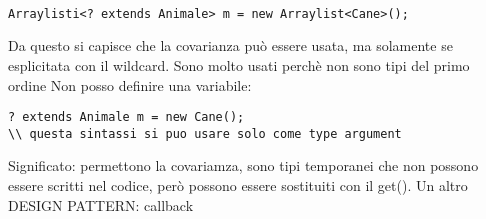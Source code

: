 \begin{lstlisting}[basicstyle=\small,]

Arraylisti<? extends Animale> m = new Arraylist<Cane>();

\end{lstlisting}

Da questo si capisce che la covarianza può essere usata, ma solamente se esplicitata con il wildcard. \newline
Sono molto usati perchè non sono tipi del primo ordine \newline
Non posso definire una variabile: \newline

\begin{lstlisting}[basicstyle=\small,]
? extends Animale m = new Cane();
\\ questa sintassi si puo usare solo come type argument
\end{lstlisting}

Significato: permettono la covariamza, sono tipi temporanei che non possono essere scritti nel codice, però possono essere sostituiti con il get(). \newline
Un altro DESIGN PATTERN: callback














